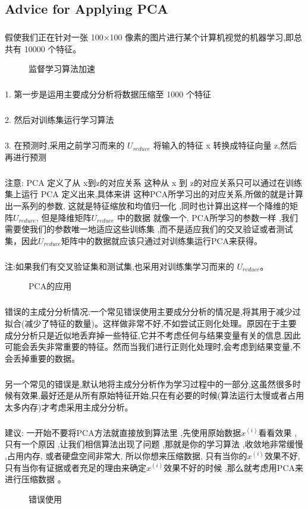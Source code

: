 \documentclass{article}
\begin{document}
\begin{CJK}{UTF8}{gbsn}
\subsection{Advice for Applying PCA}
\subparagraph{}
假使我们正在针对一张 100×100 像素的图片进行某个计算机视觉的机器学习,即总共有 10000 个特征。
\begin{figure}[H]
\caption{监督学习算法加速}
\label{fig:870}
\end{figure}
\subparagraph{}
1. 第一步是运用主要成分分析将数据压缩至 1000 个特征
\subparagraph{}
2. 然后对训练集运行学习算法
\subparagraph{}
3. 在预测时,采用之前学习而来的 $U_{reduce}$ 将输入的特征 x 转换成特征向量 z,然后再进行预测
\subparagraph{}
注意: PCA 定义了从 x到z的对应关系 这种从 x 到 z的对应关系只可以通过在训练集上运行 PCA 定义出来,具体来讲 这种PCA所学习出的对应关系,所做的就是计算出一系列的参数, 这就是特征缩放和均值归一化 ,同时也计算出这样一个降维的矩阵$U_{reduce}$, 但是降维矩阵$U_{reduce}$ 中的数据 就像一个, PCA所学习的参数一样 ,我们需要使我们的参数唯一地适应这些训练集 ,而不是适应我们的交叉验证或者测试集，因此$U_{reduce}$矩阵中的数据就应该只通过对训练集运行PCA来获得。
\subparagraph{}
注:如果我们有交叉验证集和测试集,也采用对训练集学习而来的 $U_{reduce}$。
\begin{figure}[H]
\caption{PCA的应用}
\label{fig:873}
\end{figure}
\subparagraph{}
错误的主成分分析情况:一个常见错误使用主要成分分析的情况是,将其用于减少过拟合(减少了特征的数量)。这样做非常不好,不如尝试正则化处理。原因在于主要成分分析只是近似地丢弃掉一些特征,它并不考虑任何与结果变量有关的信息,因此可能会丢失非常重要的特征。然而当我们进行正则化处理时,会考虑到结果变量,不会丢掉重要的数据。
\subparagraph{}
另一个常见的错误是,默认地将主成分分析作为学习过程中的一部分,这虽然很多时候有效果,最好还是从所有原始特征开始,只在有必要的时候(算法运行太慢或者占用太多内存)才考虑采用主成分分析。
\subparagraph{}
建议: 一开始不要将PCA方法就直接放到算法里 ,先使用原始数据$x^{(i)}$看看效果 ,只有一个原因 ,让我们相信算法出现了问题 ,那就是你的学习算法 ,收敛地非常缓慢 ,占用内存, 或者硬盘空间非常大, 所以你想来压缩数据, 只有当你的$x^{(i)}$效果不好, 只有当你有证据或者充足的理由来确定$x^{(i)}$效果不好的时候 ,那么就考虑用PCA来进行压缩数据 。
\begin{figure}[H]
\caption{错误使用}
\label{fig:874}
\end{figure}
\begin{figure}[H]

\end{figure}
\end{CJK}
\end{document}
